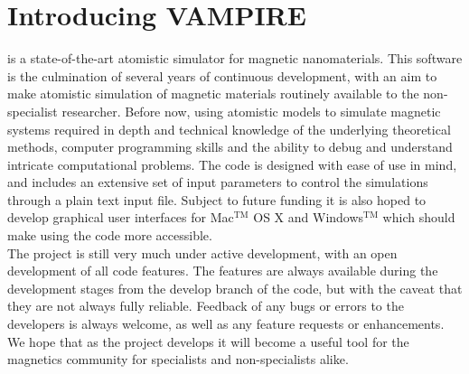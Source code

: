 \chapter*{Introducing {\Huge VAMPIRE}}
\vampire is a state-of-the-art atomistic simulator for magnetic nanomaterials. This software is the culmination of several years of continuous development, with an aim to make atomistic simulation of magnetic materials routinely available to the non-specialist researcher. Before now, using atomistic models to simulate magnetic systems required in depth and technical knowledge of the underlying theoretical methods, computer programming skills and the ability to debug and understand intricate computational problems. The code is designed with ease of use in mind, and includes an extensive set of input parameters to control the simulations through a plain text input file. Subject to future funding it is also hoped to develop graphical user interfaces for Mac$^{\mathrm{TM}}$ OS X and Windows$^{\mathrm{TM}}$ which should make using the code more accessible.\\

The \vampire project is still very much under active development, with an open development of all code features. The features are always available during the development stages from the develop branch of the code, but with the caveat that they are not always fully reliable. Feedback of any bugs or errors to the \vampire developers is always welcome, as well as any feature requests or enhancements.\\

We hope that as the \vampire project develops it will become a useful tool for the magnetics community for specialists and non-specialists alike.\\
